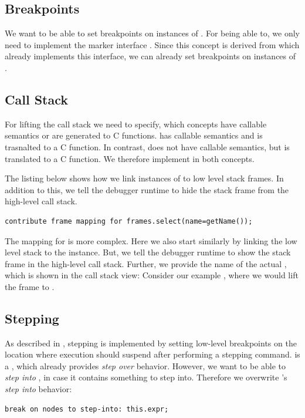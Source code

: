 \subsection{Breakpoints}  We want to be able to set breakpoints on instances of
. For being able to, we only need to implement the marker
interface . Since this concept
is derived from  which already implements this
interface, we can already set breakpoints on instances of .

\subsection{Call Stack} For lifting the call stack we need to specify, which
concepts have callable semantics or are generated to C functions. 
 has callable semantics and is trasnalted to a C
function. In contrast,  does not have callable
semantics, but is translated to a C function. We therefore implement 
 in both concepts.

The listing below shows how we link instances of
 to low level stack frames. In addition to this, we
tell the debugger runtime to hide the stack frame from the high-level call stack.

\begin{lstlisting}[language=debuggerDSL,frame=single]
contribute frame mapping for frames.select(name=getName());
\end{lstlisting}


The mapping for  is more complex. Here we also start similarly by
linking the low level stack to the  instance. But, we tell the
debugger runtime to show the stack frame in the high-level call stack.
Further, we provide the name of the actual , which is shown in the
call stack view: Consider our example , where we would
lift the frame  to .

\subsection{Stepping} As described in , stepping is
implemented by setting low-level breakpoints on the 
location where execution should suspend after
performing a stepping command.  is a , which
already provides \emph{step over} behavior. However, we want to be able to 
\emph{step into} , in case it contains something to step into. 
Therefore we overwrite 's \emph{step into} behavior: 
\begin{lstlisting}[language=debuggerDSL,frame=single]
break on nodes to step-into: this.expr;
\end{lstlisting}


